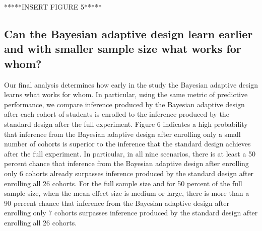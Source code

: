 \documentclass{acm_proc_article-sp}
\begin{document}
*****INSERT FIGURE 5*****

\subsection{Can the Bayesian adaptive design learn earlier and with smaller sample size what works for whom?}
Our final analysis determines how early in the study the Bayesian adaptive design learns what works for whom. In particular, using the same metric of predictive performance, we compare inference produced by the Bayesian adaptive design after each cohort of students is enrolled to the inference produced by the standard design after the full experiment. Figure 6 indicates a high probability that inference from the Bayesian adaptive design after enrolling only a small number of cohorts is superior to the inference that the standard design achieves after the full experiment. In particular, in all nine scenarios, there is at least a 50 percent chance that inference from the Bayesian adaptive design after enrolling only 6 cohorts already surpasses inference produced by the standard design after enrolling all 26 cohorts. For the full sample size and for 50 percent of the full sample size, when the mean effect size is medium or large, there is more than a 90 percent chance that inference from the Bayesian adaptive design after enrolling only 7 cohorts surpasses inference produced by the standard design after enrolling all 26 cohorts. 
\end{document}
